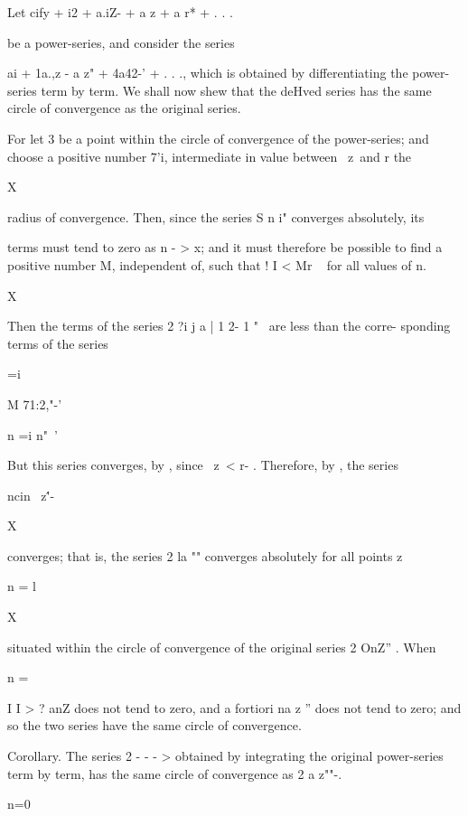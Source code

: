 
Let cify + i2 + a.iZ- + a z + a r* + . . .

be a power-series, and consider the series

ai + 1a.,z - a z" + 4a42-' + . . ., which is obtained by
differentiating the power-series term by term. We shall now shew that
the deHved series has the same circle of convergence as the original
series.

For let 3 be a point within the circle of convergence of the
power-series; and choose a positive number 7'i, intermediate in value
between \ z\ and r the

X

radius of convergence. Then, since the series S n i" converges
absolutely, its

terms must tend to zero as n - > x; and it must therefore be possible
to find a positive number M, independent of, such that ! I < Mr ~ for
all values of n.

 X

Then the terms of the series 2 ?i j a | 1 2- 1 "~ are less than the
corre- sponding terms of the series

 =i

M 71:2,"-'

n =i n"~'

But this series converges, by , since \ z\ < r- . Therefore, by , the series

 ncin \ z\''-

X

converges; that is, the series 2 la "" converges absolutely for all
points z

n = l

X

situated within the circle of convergence of the original series 2
OnZ'' . When

n =

I I > ? anZ does not tend to zero, and a fortiori na z '' does not
tend to zero; and so the two series have the same circle of
convergence.

%
%

Corollary. The series 2 - - - > obtained by integrating the original
power-series term by term, has the same circle of convergence as 2 a
z""-.

n=0


